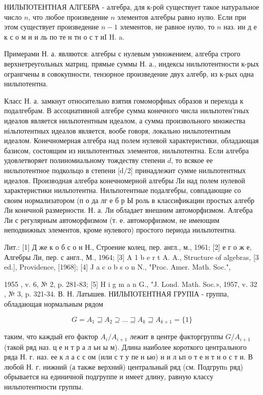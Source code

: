 \documentclass[10pt]{article}
\begin{document}
НИЛЬПОТЕНТНАЯ АЛГЕБРА - алгебра, для к-рой существует такое натуральное число $n$, что любое произведение $n$ элементов алгебры равно нулю. Если при этом существует произведение $n-1$ элементов, не равное нулю, то $n$ наз. ин д е к с о м н и ль по те н тн о с т иI H. a.



Примерами Н. а. являются: алгебры с нулевым умножением, алгебра строго верхнетреугольных матриц. прямые суммы Н. а., индексы нильпотентности к-рых огрангчены в совокупности, тензорное произведение двух алгебр, из к-рых одна нильпотентна.



Класс Н. а. замкнут относительно взятия гомоморфных образов и перехода к подалгебрам. В ассоциативной алгебре сумма конечного числа нильпотен'гных идеалов является нильпотентным идеалом, а сумма произвольного множества нільпотентных идеалов является, вообе говоря, локально нильпотентным идеалом. Конечномерная алгебра над полем нулевой характеристики, обладающая базисом, состоящим из нильпотентных элементов, нильпотентна. Если алгебра удовлетворяет полиномиальному тождеству степени $d$, то всякое ее нильпотентное подкольцо в степени [d/2] принадлежит сумме нильпотентных идеалов. Производная алгебра конечномерной алгебры Ли над полем нулевой характеристики нильпотентна. Нильпотентные подалгебры, совпадающие со своим нормализатором (п о да лг е б р Ы роль в классификации простых алгебр Ли конечной размерности. Н. а. Ли обладает внешним автоморфизмом. Алгебра Ли с регулярным автоморфизмом (т. е. автоморфизмом, не имеющим неподвижных элементов, кроме нулевого) простого периода нильпотентна.



Лит.: [1] Д же к о б с о н Н., Строение колец, пер. англ., м., 1961; [2] е г о ж е, Алгебры Ли, пер. с англ., М., 1964; [3] A 1 b e r t A. A., Structure of algebras, [3 ed.], Providence, [1968]; [4] J a c o b s o n N., "Proc. Amer. Math. Soc.",

1955 , v. 6, № 2, p. 281-83; [5] H i g m a n G., "J. Lond. Math. Soc.», 1957, v. 32 , № 3, p. 321-34. В. Н. Латышев. НИЛЬПОТЕНТНАЯ ГРУПІА - группа, обладающая нормальным рядом



\[

G=A_{1} \sqsupseteq A_{2} \supseteq \ldots \sqsupseteq A_{k} \sqsupseteq A_{k+1}=\{1\}

\]



таким, что каждый его фактор $A_{i} / A_{i+1}$ лежит в центре факторгруппы $G / A_{i+1}$ (такой ряд наз. ц е н т р а л ьн ы м). Длина наиболее короткого центрального ряда Н. г. наз. ее к л а с с ом (или с т у пе н ью) н и л ьп о т е н т н о с т и. В любой Н. г. нижний (а также верхний) центральный ряд (см. Подгрупn ряд) обрывается на единичной подгруппе и имеет длину, равную классу нильпотентности группы.
\end{document}
